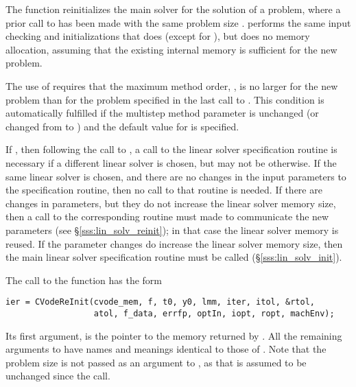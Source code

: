 The function  reinitializes the main {\cvodes} solver for
the solution of a problem, where a prior call to  has
been made with the same problem size .  performs the 
same input checking and initializations that  does 
(except for ), but does no memory allocation, assuming that the 
existing internal memory is sufficient for the new problem.             
                                                                 
The use of  requires that the maximum method order,    
, is no larger for the new problem than for the problem  
specified in the last call to .  This condition is  
automatically fulfilled if the multistep method parameter   
is unchanged (or changed from  to ) and the default    
value for  is specified.                                 
                                                                 
If , then following the call to , a call  
to the linear solver specification routine is necessary if a   
different linear solver is chosen, but may not be otherwise.   
If the same linear solver is chosen, and there are no changes  
in the input parameters to the specification routine, then no  
call to that routine is needed.                                
If there are changes in parameters, but they do not increase   
the linear solver memory size, then a call to the corresponding
 routine must made to communicate the new      
parameters (see \S\ref{sss:lin_solv_reinit}); 
in that case the linear solver memory is reused.   
If the parameter changes do increase the linear solver memory  
size, then the main linear solver specification routine must be
called (\S\ref{sss:lin_solv_init}).

The call to the  function has the form
\begin{verbatim}
ier = CVodeReInit(cvode_mem, f, t0, y0, lmm, iter, itol, &rtol, 
                  atol, f_data, errfp, optIn, iopt, ropt, machEnv);
\end{verbatim}
Its first argument,  is the pointer to the {\cvodes}
memory returned by .
All the remaining arguments to  have names and         
meanings identical to those of .  Note that the     
problem size  is not passed as an argument to ,       
as that is assumed to be unchanged since the  call. 

